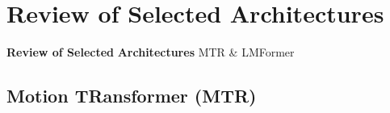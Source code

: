 \documentclass[10pt,aspectratio=169]{beamer}
\begin{document}




\section{Review of Selected Architectures}

\begin{frame}[plain]
  \begin{center}
    \vfill
    {\Huge \textbf{Review of Selected}}
    \vfill
    {\Huge \textbf{Architectures}}
    \vfill
    {\Large MTR \& LMFormer}
    \vfill
  \end{center}
\end{frame}


\subsection{Motion TRansformer (MTR)}
\end{document}
